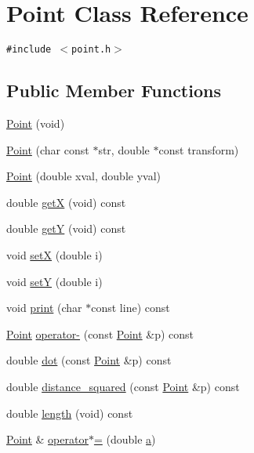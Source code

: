 \hypertarget{classPoint}{
\section{Point Class Reference}
\label{classPoint}
}
{\tt \#include $<$point.h$>$}

\subsection*{Public Member Functions}
\begin{CompactItemize}
\item 
\hyperlink{classPoint_94dc19d9beda0018169bd5ef8cd730c3}{Point} (void)
\item 
\hyperlink{classPoint_2a6d8ce5866c8d0e4e5c9d659ce6bfc2}{Point} (char const $\ast$str, double $\ast$const transform)
\item 
\hyperlink{classPoint_25ceb467297fed76765cde5c9ff20fa4}{Point} (double xval, double yval)
\item 
double \hyperlink{classPoint_b73ba91268c3d3b783fd2a0983066b38}{getX} (void) const 
\item 
double \hyperlink{classPoint_1b00b67b5e96ce7e02011c170f07bf11}{getY} (void) const 
\item 
void \hyperlink{classPoint_9290a4098a3331e34f158eeca694a26c}{setX} (double i)
\item 
void \hyperlink{classPoint_387c7e206f5ba0ea575020e53a66fb55}{setY} (double i)
\item 
void \hyperlink{classPoint_67517850a2ef6cfe8d6beb161be65e5c}{print} (char $\ast$const line) const 
\item 
\hyperlink{classPoint}{Point} \hyperlink{classPoint_6a869eababaaf863740e3196b9ca6780}{operator-} (const \hyperlink{classPoint}{Point} \&p) const 
\item 
double \hyperlink{classPoint_a51050f8b9868c12b1a9d063e8555d05}{dot} (const \hyperlink{classPoint}{Point} \&p) const 
\item 
double \hyperlink{classPoint_99717644bf38e3868c9ff7f32f4a9226}{distance\_\-squared} (const \hyperlink{classPoint}{Point} \&p) const 
\item 
double \hyperlink{classPoint_41052067de2f7e0be2bf0b60c1e7f60d}{length} (void) const 
\item 
\hyperlink{classPoint}{Point} \& \hyperlink{classPoint_aed1420449367308540f3459049ac2bd}{operator$\ast$=} (double \hyperlink{proximity__energy_8m_4124bc0a9335c27f086f24ba207a4912}{a})
\end{CompactItemize}


